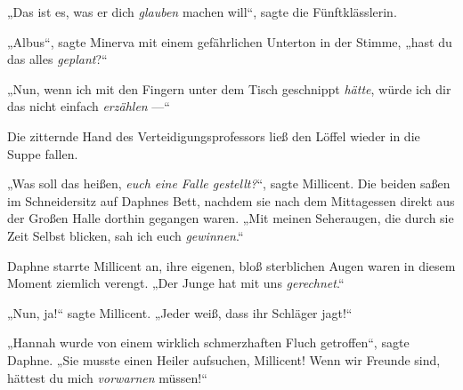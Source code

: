 „Das ist es, was er dich \emph{glauben} machen will“, sagte die Fünftklässlerin.

\later

„Albus“, sagte Minerva mit einem gefährlichen Unterton in der Stimme, „hast du das alles \emph{geplant}?“

\later

„Nun, wenn ich mit den Fingern unter dem Tisch geschnippt \emph{hätte}, würde ich dir das nicht einfach \emph{erzählen} —“

\later

Die zitternde Hand des Verteidigungsprofessors ließ den Löffel wieder in die Suppe fallen.

\later

„Was soll das heißen, \emph{euch eine Falle gestellt?}“, sagte Millicent. Die beiden saßen im Schneidersitz auf Daphnes Bett, nachdem sie nach dem Mittagessen direkt aus der Großen Halle dorthin gegangen waren.
„Mit meinen Seheraugen, die durch sie Zeit Selbst blicken, sah ich euch \emph{gewinnen}.“

Daphne starrte Millicent an, ihre eigenen, bloß sterblichen Augen waren in diesem Moment ziemlich verengt.
„Der Junge hat mit uns \emph{gerechnet}.“

„Nun, ja!“ sagte Millicent.
„Jeder weiß, dass ihr Schläger jagt!“

„Hannah wurde von einem wirklich schmerzhaften Fluch getroffen“, sagte Daphne.
„Sie musste einen Heiler aufsuchen, Millicent! Wenn wir Freunde sind, hättest du mich \emph{vorwarnen} müssen!“

